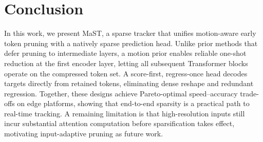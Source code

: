 \documentclass[runningheads]{llncs}
\begin{document}




\section{Conclusion}
In this work, we present MaST, a sparse tracker that unifies motion-aware early token pruning with a natively sparse prediction head. Unlike prior methods that defer pruning to intermediate layers, a motion prior enables reliable one-shot reduction at the first encoder layer, letting all subsequent Transformer blocks operate on the compressed token set. A score-first, regress-once head decodes targets directly from retained tokens, eliminating dense reshape and redundant regression. Together, these designs achieve Pareto-optimal speed--accuracy trade-offs on edge platforms, showing that end-to-end sparsity is a practical path to real-time tracking. A remaining limitation is that high-resolution inputs still incur substantial attention computation before sparsification takes effect, motivating input-adaptive pruning as future work.




%
%


\clearpage

% 
\end{document}
